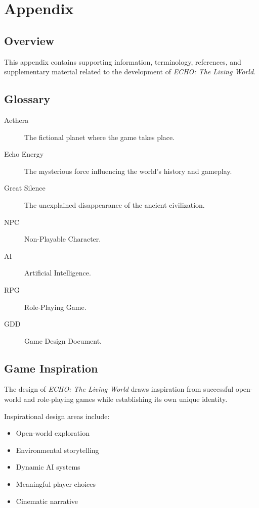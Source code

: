 \chapter{Appendix}

\section{Overview}

This appendix contains supporting information, terminology, references, and supplementary material related to the development of \textit{ECHO: The Living World}.

\section{Glossary}

\begin{description}
    \item[Aethera] The fictional planet where the game takes place.
    \item[Echo Energy] The mysterious force influencing the world's history and gameplay.
    \item[Great Silence] The unexplained disappearance of the ancient civilization.
    \item[NPC] Non-Playable Character.
    \item[AI] Artificial Intelligence.
    \item[RPG] Role-Playing Game.
    \item[GDD] Game Design Document.
\end{description}

\section{Game Inspiration}

The design of \textit{ECHO: The Living World} draws inspiration from successful open-world and role-playing games while establishing its own unique identity.

Inspirational design areas include:

\begin{itemize}
    \item Open-world exploration
    \item Environmental storytelling
    \item Dynamic AI systems
    \item Meaningful player choices
    \item Cinematic narrative
\end{itemize}

